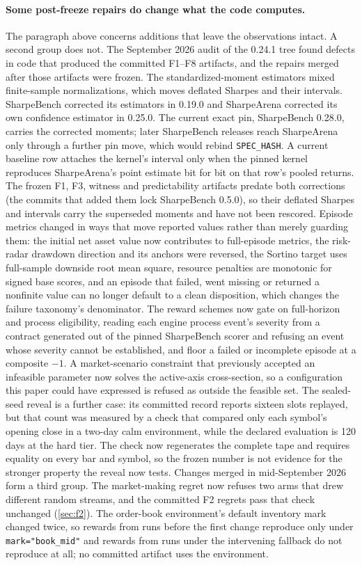 \paragraph{Some post-freeze repairs do change what the code computes.} The paragraph above concerns additions that leave the observations intact. A second group does not. The September 2026 audit of the 0.24.1 tree found defects in code that produced the committed F1--F8 artifacts, and the repairs merged after those artifacts were frozen. The standardized-moment estimators mixed finite-sample normalizations, which moves deflated Sharpes and their intervals. SharpeBench corrected its estimators in 0.19.0 and SharpeArena corrected its own confidence estimator in 0.25.0. The current exact pin, SharpeBench 0.28.0, carries the corrected moments; later SharpeBench releases reach SharpeArena only through a further pin move, which would rebind \texttt{SPEC\_HASH}. A current baseline row attaches the kernel's interval only when the pinned kernel reproduces SharpeArena's point estimate bit for bit on that row's pooled returns. The frozen F1, F3, witness and predictability artifacts predate both corrections (the commits that added them lock SharpeBench 0.5.0), so their deflated Sharpes and intervals carry the superseded moments and have not been rescored. Episode metrics changed in ways that move reported values rather than merely guarding them: the initial net asset value now contributes to full-episode metrics, the risk-radar drawdown direction and its anchors were reversed, the Sortino target uses full-sample downside root mean square, resource penalties are monotonic for signed base scores, and an episode that failed, went missing or returned a nonfinite value can no longer default to a clean disposition, which changes the failure taxonomy's denominator. The reward schemes now gate on full-horizon and process eligibility, reading each engine process event's severity from a contract generated out of the pinned SharpeBench scorer and refusing an event whose severity cannot be established, and floor a failed or incomplete episode at a composite $-1$. A market-scenario constraint that previously accepted an infeasible parameter now solves the active-axis cross-section, so a configuration this paper could have expressed is refused as outside the feasible set. The sealed-seed reveal is a further case: its committed record reports sixteen slots replayed, but that count was measured by a check that compared only each symbol's opening close in a two-day calm environment, while the declared evaluation is 120 days at the hard tier. The check now regenerates the complete tape and requires equality on every bar and symbol, so the frozen number is not evidence for the stronger property the reveal now tests. Changes merged in mid-September 2026 form a third group. The market-making regret now refuses two arms that drew different random streams, and the committed F2 regrets pass that check unchanged (\cref{sec:f2}). The order-book environment's default inventory mark changed twice, so rewards from runs before the first change reproduce only under \texttt{mark="book\_mid"} and rewards from runs under the intervening fallback do not reproduce at all; no committed artifact uses the environment. 